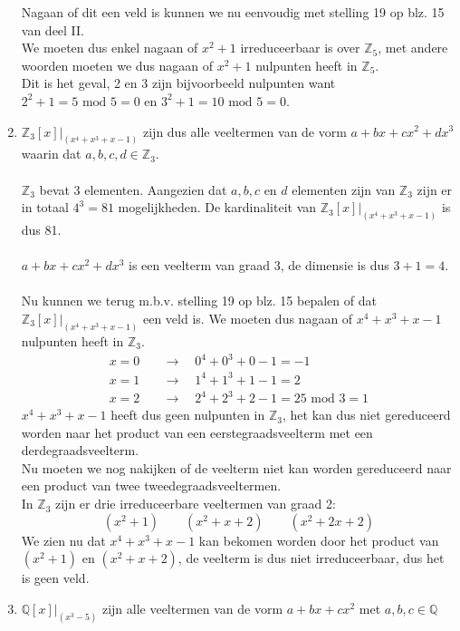 \documentclass[11pt,a4paper,titlepage]{article}
\begin{document}
\begin{enumerate}[label=(\alph*)]
		Nagaan of dit een veld is kunnen we nu eenvoudig met stelling 19 op blz. 15 van deel II.\\ 
		We moeten dus enkel nagaan of $x^2+1$ irreduceerbaar is over $\mathbb{Z}_5$, met andere woorden moeten we dus nagaan of $x^2+1$ nulpunten heeft in $\mathbb{Z}_5$.\\
		Dit is het geval, 2 en 3 zijn bijvoorbeeld nulpunten want $2^2 + 1 = 5 \text{ mod } 5 = 0$ en $3^2 + 1 = 10 \text{ mod } 5 = 0$.
	\item $\mathbb{Z}_3[x]|_{(x^4+x^3+x-1)}$ zijn dus alle veeltermen van de vorm $a + bx + cx^2 + dx^3$ waarin dat $a,b,c,d \in \mathbb{Z}_3$. \\ \\
		$\mathbb{Z}_3$ bevat 3 elementen. Aangezien dat $a,b,c$ en $d$ elementen zijn van $\mathbb{Z}_3$ zijn er in totaal $4^3 = 81$ mogelijkheden. De kardinaliteit van $\mathbb{Z}_3[x]|_{(x^4+x^3+x-1)}$ is dus 81. \\ \\
		 $a + bx + cx^2 + dx^3$ is een veelterm van graad 3, de dimensie is dus $3+1 = 4$.\\ \\
		Nu kunnen we terug m.b.v. stelling 19 op blz. 15 bepalen of dat $\mathbb{Z}_3[x]|_{(x^4+x^3+x-1)}$ een veld is. We moeten dus nagaan of $x^4+x^3+x-1$ nulpunten heeft in $\mathbb{Z}_3$.
		\begin{align*}
			x = 0 \quad &\rightarrow \quad 0^4+0^3+0-1 = -1\\
			x = 1 \quad &\rightarrow \quad 1^4 + 1^3 + 1 -1 = 2\\
			x = 2 \quad &\rightarrow \quad 2^4 + 2^3 + 2 -1 = 25 \text{ mod } 3 = 1
		\end{align*}
		$x^4+x^3+x-1$ heeft dus geen nulpunten in $\mathbb{Z}_3$, het kan dus niet gereduceerd worden naar het product van een eerstegraadsveelterm met een derdegraadsveelterm.\\
		Nu moeten we nog nakijken of de veelterm niet kan worden gereduceerd naar een product van twee tweedegraadsveeltermen. \\
		In $\mathbb{Z}_3$ zijn er drie irreduceerbare veeltermen van graad 2:
			$$(x^2 + 1) \quad \quad (x^2+x+2) \quad \quad (x^2+2x+2)$$
		We zien nu dat $x^4+x^3+x-1$ kan bekomen worden door het product van $(x^2 + 1)$ en $(x^2+x+2)$, de veelterm is dus niet irreduceerbaar, dus het is geen veld.
	\item $\mathbb{Q}[x]|_{(x^3-5)}$ zijn alle veeltermen van de vorm $a + bx + cx^2$ met $a,b,c \in \mathbb{Q}$ \\ \\

\end{enumerate}
\end{document}
